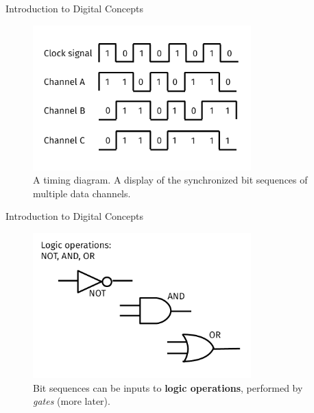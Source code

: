 \documentclass{beamer}
\begin{document}
\begin{frame}{Introduction to Digital Concepts}
\begin{figure}
\centering
\includegraphics[width=0.75\textwidth]{figures/BitSequence2.pdf}
\caption{\label{fig:bitsequence2} A timing diagram.  A display of the synchronized bit sequences of multiple data channels.}
\end{figure}
\end{frame}

\begin{frame}{Introduction to Digital Concepts}
\begin{figure}
\centering
\includegraphics[width=0.75\textwidth]{figures/Operators.pdf}
\caption{\label{fig:operators} Bit sequences can be inputs to \textbf{logic operations}, performed by \textit{gates} (more later).}
\end{figure}
\end{frame}
\end{document}
